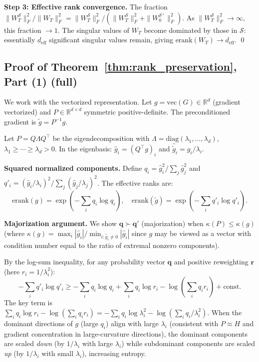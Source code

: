 \documentclass{article}
\newcommand{\erank}{\mathrm{erank}}
\newcommand{\diag}{\mathrm{diag}}
\newcommand{\RR}{\mathbb{R}}
\newcommand{\cS}{\mathcal{S}}
\begin{document}
\textbf{Step 3: Effective rank convergence.} The fraction $\|W_T^{\cS}\|_F^2 / \|W_T\|_F^2 = \|W_T^{\cS}\|_F^2 / (\|W_T^{\cS}\|_F^2 + \|W_0^{\cS^\perp}\|_F^2)$. As $\|W_T^{\cS}\|_F^2 \to \infty$, this fraction $\to 1$. The singular values of $W_T$ become dominated by those in $\cS$: essentially $d_\mathrm{eff}$ significant singular values remain, giving $\erank(W_T) \to d_\mathrm{eff}$. \qed

\subsection{Proof of Theorem~\ref{thm:rank_preservation}, Part (1) (full)}
\label{app:proof_thm2}

We work with the vectorized representation. Let $g = \mathrm{vec}(G) \in \RR^d$ (gradient vectorized) and $P \in \RR^{d\times d}$ symmetric positive-definite. The preconditioned gradient is $\tilde{g} = P^{-1}g$.

Let $P = Q\Lambda Q^\top$ be the eigendecomposition with $\Lambda = \diag(\lambda_1,\ldots,\lambda_d)$, $\lambda_1 \geq \cdots \geq \lambda_d > 0$. In the eigenbasis: $\hat{g}_i = (Q^\top g)_i$ and $\hat{\tilde{g}}_i = \hat{g}_i / \lambda_i$.

\textbf{Squared normalized components.} Define $q_i = \hat{g}_i^2 / \sum_j \hat{g}_j^2$ and $q'_i = (\hat{g}_i/\lambda_i)^2 / \sum_j (\hat{g}_j/\lambda_j)^2$. The effective ranks are:
\[
\erank(g) = \exp(-\sum_i q_i \log q_i), \quad \erank(\tilde{g}) = \exp(-\sum_i q'_i \log q'_i).
\]

\textbf{Majorization argument.} We show $\bm{q} \succ \bm{q}'$ (majorization) when $\kappa(P) \leq \kappa(g)$ (where $\kappa(g) = \max_i |\hat{g}_i| / \min_{i: \hat{g}_i \neq 0} |\hat{g}_i|$ since $g$ may be viewed as a vector with condition number equal to the ratio of extremal nonzero components).

By the log-sum inequality, for any probability vector $\bm{q}$ and positive reweighting $\bm{r}$ (here $r_i = 1/\lambda_i^2$):
\[
-\sum_i q'_i \log q'_i \geq -\sum_i q_i \log q_i + \sum_i q_i \log r_i - \log\left(\sum_i q_i r_i\right) + \text{const}.
\]
The key term is $\sum_i q_i \log r_i - \log(\sum_i q_i r_i) = -\sum_i q_i \log\lambda_i^2 - \log(\sum_i q_i/\lambda_i^2)$. When the dominant directions of $g$ (large $q_i$) align with large $\lambda_i$ (consistent with $P \approx H$ and gradient concentration in large-curvature directions), the dominant components are scaled \emph{down} (by $1/\lambda_i$ with large $\lambda_i$) while subdominant components are scaled \emph{up} (by $1/\lambda_i$ with small $\lambda_i$), increasing entropy.
\end{document}
